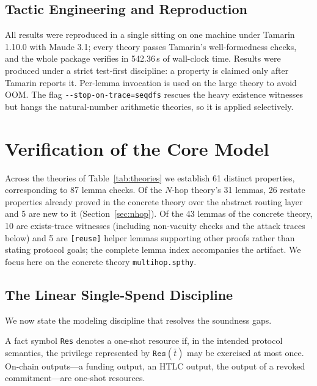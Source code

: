\documentclass[sigconf,review]{acmart}
\theoremstyle{acmdefinition}
\begin{document}
\subsection{Tactic Engineering and Reproduction}
All results were reproduced in a single sitting on one machine under Tamarin 1.10.0 with Maude 3.1; every theory passes Tamarin's well-formedness checks, and the whole package verifies in 542.36\,s of wall-clock time. Results were produced under a strict test-first discipline: a property is claimed only after Tamarin reports it. Per-lemma invocation is used on the large theory to avoid OOM. The flag \texttt{-{}-stop-on-trace=seqdfs} rescues the heavy existence witnesses but hangs the natural-number arithmetic theories, so it is applied selectively.

\section{Verification of the Core Model}
\label{sec:verification}



Across the theories of Table~\ref{tab:theories} we establish 61 distinct properties, corresponding to 87 lemma checks. Of the $N$-hop theory's 31 lemmas, 26 restate properties already proved in the concrete theory over the abstract routing layer and 5 are new to it (Section~\ref{sec:nhop}). Of the 43 lemmas of the concrete theory, 10 are exists-trace witnesses (including non-vacuity checks and the attack traces below) and 5 are \texttt{[reuse]} helper lemmas supporting other proofs rather than stating protocol goals; the complete lemma index accompanies the artifact. We focus here on the concrete theory \texttt{multihop.spthy}.

\subsection{The Linear Single-Spend Discipline}
\label{sec:discipline}
We now state the modeling discipline that resolves the soundness gaps.

\begin{definition}
\label{def:oneshot}
A fact symbol \texttt{Res} denotes a one-shot resource if, in the intended protocol semantics, the privilege represented by $\texttt{Res}(\bar t)$ may be exercised at most once. On-chain outputs---a funding output, an HTLC output, the output of a revoked commitment---are one-shot resources.
\end{definition}
\end{document}
